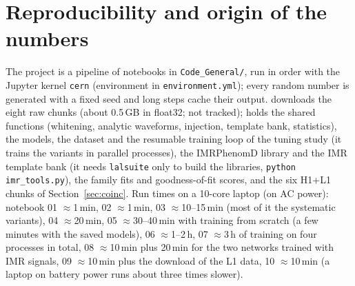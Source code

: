 \section{Reproducibility and origin of the numbers}\label{app:code}

The project is a pipeline of notebooks in \texttt{Code\_General/}, run in order with the Jupyter kernel \texttt{cern} (environment in \texttt{environment.yml}); every random number is generated with a fixed seed and long steps cache their output.
 downloads the eight raw chunks (about 0.5\,GB in float32; not tracked);  holds the shared functions (whitening, analytic waveforms, injection, template bank, statistics),  the models, the dataset and the resumable training loop of the tuning study (it trains the variants in parallel processes),  the IMRPhenomD library and the IMR template bank (it needs \texttt{lalsuite} only to build the libraries, \texttt{python imr\_tools.py}),  the family fits and goodness-of-fit scores, and  the six H1+L1 chunks of Section~\ref{sec:coinc}.
Run times on a 10-core laptop (on AC power): notebook 01 $\approx$1\,min, 02 $\approx$1\,min, 03 $\approx$10--15\,min (most of it the systematic variants), 04 $\approx$20\,min, 05 $\approx$30--40\,min with training from scratch (a few minutes with the saved models), 06 $\approx$1--2\,h, 07 $\approx$3\,h of training on four processes in total, 08 $\approx$10\,min plus 20\,min for the two networks trained with IMR signals, 09 $\approx$10\,min plus the download of the L1 data, 10 $\approx$10\,min (a laptop on battery power runs about three times slower).

